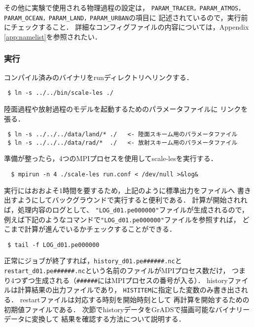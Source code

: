 その他に実験で使用される物理過程の設定は，
\verb|PARAM_TRACER，PARAM_ATMOS，PARAM_OCEAN，PARAM_LAND，PARAM_URBAN|の項目に
記述されているので，実行前にチェックすること．
詳細なコンフィグファイルの内容については，Appendix \ref{app:namelist}を参照されたい．

%
\subsubsection{実行}
コンパイル済みのバイナリをrunディレクトリへリンクする．

\begin{verbatim}
 $ ln -s ../../bin/scale-les ./
\end{verbatim}
陸面過程や放射過程のモデルを起動するためのパラメータファイルに
リンクを張る．
\begin{verbatim}
 $ ln -s ../../../data/land/* ./   <- 陸面スキーム用のパラメータファイル
 $ ln -s ../../../data/rad/*  ./   <- 放射スキーム用のパラメータファイル
\end{verbatim}
準備が整ったら，4つのMPIプロセスを使用してscale-lesを実行する．
\begin{verbatim}
  $ mpirun -n 4 ./scale-les run.conf < /dev/null >&log&
\end{verbatim}

実行にはおおよそ1時間を要するため，上記のように標準出力をファイルへ
書き出すようにしてバックグラウンドで実行すると便利である．
計算が開始されれば，処理内容のログとして、
\verb|"LOG_d01.pe000000"|ファイルが生成されるので，
例えば下記のようなコマンドで\verb|"LOG_d01.pe000000"|ファイルを参照すれば，
どこまで計算が進んでいるかチェックすることができる．
\begin{verbatim}
 $ tail -f LOG_d01.pe000000
\end{verbatim}
正常にジョブが終了すれば，\verb|history_d01.pe######.nc|と
\verb|restart_d01.pe######.nc|という名前のファイルがMPIプロセス数だけ，
つまり4つずつ生成される（\verb|######|にはMPIプロセスの番号が入る）．
historyファイルは計算結果の出力ファイルであり，
\verb|HISTITEM|に指定した変数のみ書き出される．
restartファイルは対応する時刻を開始時刻として
再計算を開始するための初期値ファイルである．
次節でhistoryデータをGrADSで描画可能なバイナリーデータに変換して
結果を確認する方法について説明する．


